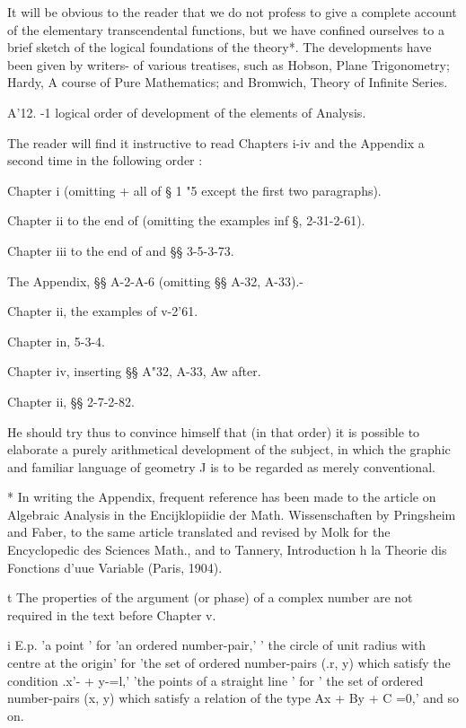 It will be obvious to the reader that we do not profess to give a
complete account of the elementary transcendental functions, but we
have confined ourselves to a brief sketch of the logical foundations
of the theory*. The developments have been given by writers- of
various treatises, such as Hobson, Plane Trigonometry; Hardy, A
course of Pure Mathematics; and Bromwich, Theory of Infinite Series.

A'12. -1 logical order of development of the elements of Analysis.

The reader will find it instructive to read Chapters i-iv and the
Appendix a second time in the following order :

Chapter i (omitting + all of § 1 "5 except the first two paragraphs).

Chapter ii to the end of (omitting the examples inf §,
2-31-2-61).

Chapter iii to the end of and §§ 3-5-3-73.

The Appendix, §§ A-2-A-6 (omitting §§ A-32, A-33).-

Chapter ii, the examples of v-2'61.

Chapter in, 5-3-4.

Chapter iv, inserting §§ A"32, A-33, Aw after.

Chapter ii, §§ 2-7-2-82.

He should try thus to convince himself that (in that order) it is
possible to elaborate a purely arithmetical development of the
subject, in which the graphic and familiar language of geometry J is
to be regarded as merely conventional.

* In writing the Appendix, frequent reference has been made to the
article on Algebraic Analysis in the Encijklopiidie der Math.
Wissenschaften by Pringsheim and Faber, to the same article translated
and revised by Molk for the Encyclopedic des Sciences Math., and to
Tannery, Introduction h la Theorie dis Fonctions d'uue Variable
(Paris, 1904).

t The properties of the argument (or phase) of a complex number are
not required in the text before Chapter v.

i E.p. 'a point ' for 'an ordered number-pair,' ' the circle of unit
radius with centre at the origin' for 'the set of ordered number-pairs
(.r, y) which satisfy the condition .x'- + y-=l,' 'the points of a
straight line ' for ' the set of ordered number-pairs (x, y) which
satisfy a relation of the type Ax + By + C =0,' and so on.

